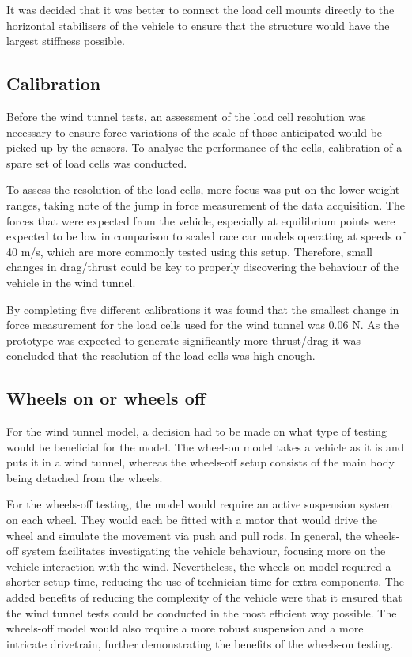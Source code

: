 

It was decided that it was better to connect the load cell mounts directly to the horizontal stabilisers of the vehicle to ensure that the structure would have the largest stiffness possible.

\subsection{Calibration}

Before the wind tunnel tests, an assessment of the load cell resolution was necessary to ensure force variations of the scale of those anticipated would be picked up by the sensors.  To analyse the performance of the cells, calibration of a spare set of load cells was conducted. 

To assess the resolution of the load cells, more focus was put on the lower weight ranges, taking note of the jump in force measurement of the data acquisition. The forces that were expected from the vehicle, especially at equilibrium points were expected to be low in comparison to scaled race car models operating at speeds of 40 m/s, which are more commonly tested using this setup. Therefore, small changes in drag/thrust could be key to properly discovering the behaviour of the vehicle in the wind tunnel. 

By completing five different calibrations it was found that the smallest change in force measurement for the load cells used for the wind tunnel was 0.06 N. As the prototype was expected to generate significantly more thrust/drag it was concluded that the resolution of the load cells was high enough.

\subsection{Wheels on or wheels off}

For the wind tunnel model, a decision had to be made on what type of testing would be beneficial for the model. The wheel-on model takes a vehicle as it is and puts it in a wind tunnel, whereas the wheels-off setup consists of the main body being detached from the wheels.

For the wheels-off testing, the model would require an active suspension system on each wheel. They would each be fitted with a motor that would drive the wheel and simulate the movement via push and pull rods. In general, the wheels-off system facilitates investigating the vehicle behaviour, focusing more on the vehicle interaction with the wind. Nevertheless, the wheels-on model required a shorter setup time, reducing the use of technician time for extra components. The added benefits of reducing the complexity of the vehicle were that it ensured that the wind tunnel tests could be conducted in the most efficient way possible. The wheels-off model would also require a more robust suspension and a more intricate drivetrain, further demonstrating the benefits of the wheels-on testing.

